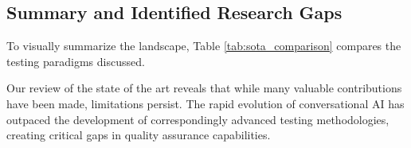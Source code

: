 \subsection{Summary and Identified Research Gaps}

To visually summarize the landscape,
Table \ref{tab:sota_comparison}
compares the testing paradigms discussed.

\begin{table}[h!]
\centering
\caption{Comparison of State-of-the-Art Chatbot Testing Paradigms}
\label{tab:sota_comparison}
\end{table}

Our review of the state of the art
reveals that while many valuable contributions have been made,
limitations persist.
The rapid evolution of conversational AI
has outpaced the development of
correspondingly advanced testing methodologies,
creating critical gaps in quality assurance capabilities.

